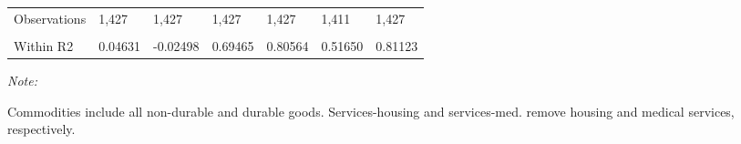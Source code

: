 \begin{table}
{\begin{threeparttable}
\begin{tabular}[t]{lllllll}
\addlinespace
Observations & 1,427 & 1,427 & 1,427 & 1,427 & 1,411 & 1,427\\
\addlinespace
\cellcolor{gray!6}{R2} & \cellcolor{gray!6}{0.92791} & \cellcolor{gray!6}{0.89796} & \cellcolor{gray!6}{0.98806} & \cellcolor{gray!6}{0.95506} & \cellcolor{gray!6}{0.93105} & \cellcolor{gray!6}{0.95254}\\
\addlinespace
Within R2 & 0.04631 & -0.02498 & 0.69465 & 0.80564 & 0.51650 & 0.81123\\
\bottomrule
\end{tabular}
\begin{tablenotes}
\item \textit{Note: } 
\item Commodities include all non-durable and durable goods.  Services-housing and services-med. remove housing and medical services, respectively.
\end{tablenotes}
\end{threeparttable}}
\end{table}
